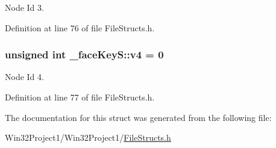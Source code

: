 Node Id 3. 



Definition at line 76 of file File\+Structs.\+h.

\subsubsection[{\texorpdfstring{v4}{v4}}]{\setlength{\rightskip}{0pt plus 5cm}unsigned int \+\_\+face\+Key\+S\+::v4 = 0}\hypertarget{struct__face_key_s_ae749de93a9e487bd0219653f2b51e794}{}\label{struct__face_key_s_ae749de93a9e487bd0219653f2b51e794}


Node Id 4. 



Definition at line 77 of file File\+Structs.\+h.



The documentation for this struct was generated from the following file\+:\begin{DoxyCompactItemize}
\item 
Win32\+Project1/\+Win32\+Project1/\hyperlink{_file_structs_8h}{File\+Structs.\+h}\end{DoxyCompactItemize}

